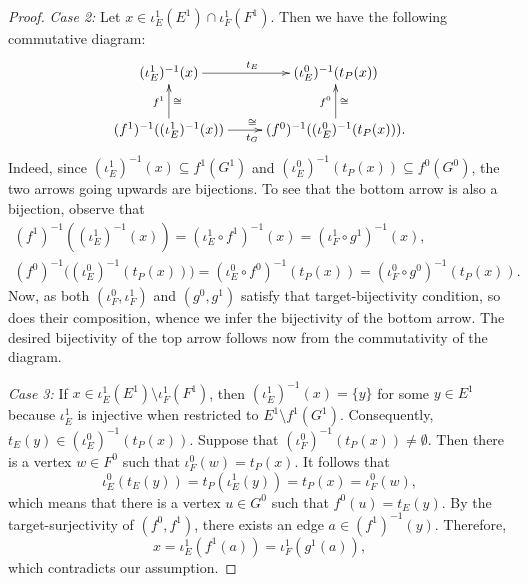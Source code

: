 \documentclass[12pt,times,a4paper]{amsart}
\numberwithin{equation}{section}
\numberwithin{equation}{section}
\begin{document}
\begin{proof}
\emph{Case 2:}
Let $x\in\iota_E^1(E^1)\cap\iota_F^1(F^1)$. Then we have the following commutative diagram:
\begin{equation}
\xymatrix{
(\iota_E^1)^{-1}(x) \ar[r]^{t_E} & (\iota_E^0)^{-1}(t_P(x))\\
(f^1)^{-1}((\iota_E^1)^{-1}(x)) \ar[u]^{f^1}_{\cong} \ar[r]_{t_G}^{\cong} 
& (f^0)^{-1}((\iota_E^0)^{-1}(t_P(x))) \ar[u]^{f^0}_{\cong}.
}
\end{equation}
Indeed, since $(\iota^1_E)^{-1}(x)\subseteq f^1(G^1)$ and $(\iota_E^0)^{-1}(t_P(x))\subseteq f^0(G^0)$, 
the two arrows going upwards are bijections.
To see that the bottom arrow is also a bijection, observe that 
\begin{gather}
(f^1)^{-1}((\iota_E^1)^{-1}(x))=(\iota_E^1\circ f^1)^{-1}(x)=(\iota_F^1\circ g^1)^{-1}(x),
\nonumber\\
(f^0)^{-1}\big((\iota_E^0)^{-1}(t_P(x))\big)=(\iota_E^0\circ f^0)^{-1}(t_P(x))=(\iota_F^0\circ g^0)^{-1}(t_P(x)).
\end{gather}
Now, as both $(\iota_F^0,\iota_F^1)$ and $(g^0,g^1)$ satisfy that target-bijectivity condition, so does their composition,
whence we infer the bijectivity of the bottom arrow. The desired bijectivity of  the top arrow follows now from the commutativity
of the diagram.

\emph{Case 3:} 
If $x\in\iota_E^1(E^1)\setminus\iota_F^1(F^1)$, then $(\iota_E^1)^{-1}(x)=\{y\}$ for some $y\in E^1$ because $\iota_E^1$ is 
injective when restricted to $E^1\setminus f^1(G^1)$. Consequently, $t_E(y)\in (\iota_E^0)^{-1}(t_P(x))$. Suppose that 
$(\iota_F^0)^{-1}(t_P(x))\neq\emptyset$. Then there is a vertex $w\in F^0$ such that $\iota_F^0(w)=t_P(x)$. It follows that 
\begin{equation}
\iota_E^0(t_E(y))=t_P(\iota^1_E(y))=t_P(x)=\iota_F^0(w),
\end{equation}
 which means that there is a vertex $u\in G^0$ such that 
$f^0(u)=t_E(y)$. By the target-surjectivity of $(f^0,f^1)$, there exists an edge $a\in (f^1)^{-1}(y)$. Therefore, 
\begin{equation}
x=\iota_E^1(f^1(a))=\iota_F^1(g^1(a)), 
\end{equation}
which contradicts our assumption.
\end{proof}
\end{document}

